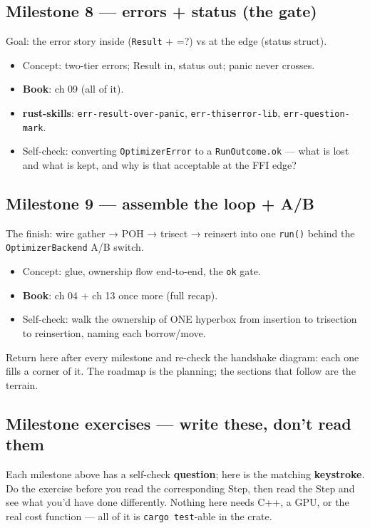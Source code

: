 \documentclass[11pt]{article}
\begin{document}
\subsection{Milestone 8 — errors + status (the gate)}
\label{sec:org31aa25c}

Goal: the error story inside (\texttt{Result} + =?) vs at the edge (status struct).

\begin{itemize}
\item Concept: two-tier errors; Result in, status out; panic never crosses.
\item \textbf{\textbf{Book}}: ch 09 (all of it).
\item \textbf{\textbf{rust-skills}}: \texttt{err-result-over-panic}, \texttt{err-thiserror-lib}, \texttt{err-question-mark}.
\item Self-check: converting \texttt{OptimizerError} to a \texttt{RunOutcome.ok} — what is lost
and what is kept, and why is that acceptable at the FFI edge?
\end{itemize}
\subsection{Milestone 9 — assemble the loop + A/B}
\label{sec:orgef685ed}

The finish: wire gather → POH → trisect → reinsert into one \texttt{run()} behind the
\texttt{OptimizerBackend} A/B switch.

\begin{itemize}
\item Concept: glue, ownership flow end-to-end, the \texttt{ok} gate.
\item \textbf{\textbf{Book}}: ch 04 + ch 13 once more (full recap).
\item Self-check: walk the ownership of ONE hyperbox from insertion to trisection
to reinsertion, naming each borrow/move.
\end{itemize}

Return here after every milestone and re-check the handshake diagram: each one
fills a corner of it. The roadmap is the planning; the sections that follow are
the terrain.
\subsection{Milestone exercises — write these, don't read them}
\label{sec:orga29badd}

Each milestone above has a self-check \textbf{question}; here is the matching
\textbf{keystroke}. Do the exercise before you read the corresponding Step, then read
the Step and see what you'd have done differently. Nothing here needs C++, a
GPU, or the real cost function — all of it is \texttt{cargo test}-able in the crate.
\end{document}
